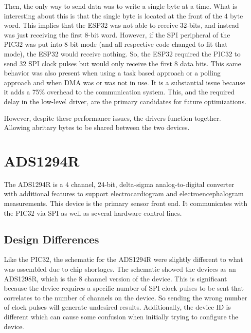 Then, the only way to send data was to write a single byte at a time.
What is interesting about this is that the single byte is located at the front of the 4 byte word.
This implies that the ESP32 was not able to receive 32-bits, and instead was just receiving the first 8-bit word.
However, if the SPI peripheral of the PIC32 was put into 8-bit mode (and all respective code changed to fit that mode),
the ESP32 would receive nothing.
So, the ESP32 required the PIC32 to send 32 SPI clock pulses but would only receive the first 8 data bits.
This same behavior was also present when using a task based approach or a polling approach and when DMA was or was not in use.
It is a substantial issue because it adds a 75\% overhead to the communication system.
This, and the required delay in the low-level driver, are the primary candidates for future optimizations.

However, despite these performance issues, the drivers function together.
Allowing abritary bytes to be shared between the two devices.


\section{ADS1294R}
The ADS1294R is a 4 channel, 24-bit, delta-sigma analog-to-digital converter with additional features to support electrocardiogram and electroencephalogram measurements.
This device is the primary sensor front end.
It communicates with the PIC32 via SPI as well as several hardware control lines.

\subsection{Design Differences}
Like the PIC32, the schematic for the ADS1294R were slightly different to what was assembled due to chip shortages.
The schematic showed the devices as an ADS1298R, which is the 8 channel version of the device.
This is significant because the device requires a specific number of SPI clock pulses to be sent that correlates to the number of channels on the device.
So sending the wrong number of clock pulses will generate undesired results.
Additionally, the device ID is different which can cause some confusion when initially trying to configure the device.

